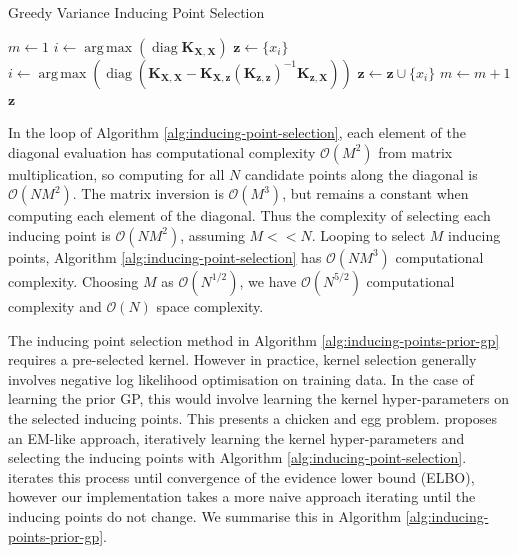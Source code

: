 \documentclass{article}
\newcommand{\diag}{\operatorname{diag}}
\DeclareMathOperator*{\argmax}{arg\,max}
\numberwithin{equation}{section}
\begin{document}
\begin{algorithm}
\caption{Greedy Variance Inducing Point Selection}\label{alg:inducing-point-selection}
\begin{algorithmic}
\State $m \leftarrow 1$
 \State $i \leftarrow \argmax \left(\diag\mathbf{K}_{\mathbf{X}, \mathbf{X}}\right) $
 \State $\mathbf{z} \leftarrow \{x_i\}$
\State$i \leftarrow \argmax \left(\diag \left(\mathbf{K}_{\mathbf{X}, \mathbf{X}} - \mathbf{K}_{\mathbf{X}, \mathbf{z}} \left(\mathbf{K}_{\mathbf{z}, \mathbf{z}}\right)^{-1}\mathbf{K}_{\mathbf{z}, \mathbf{X}}\right)\right)$
 \State  $\mathbf{z} \leftarrow \mathbf{z} \cup \{x_i\}$
 \State  $m \leftarrow m+1$
\EndWhile
\State \Return $\mathbf{z}$
\end{algorithmic}
\end{algorithm}

In the loop of Algorithm \ref{alg:inducing-point-selection}, each element of the diagonal evaluation has computational complexity $\mathcal{O}(M^2)$ from matrix multiplication, so computing for all $N$ candidate points along the diagonal is $\mathcal{O}(NM^2)$.
The matrix inversion is $\mathcal{O}(M^3)$, but remains a constant when computing each element of the diagonal.
Thus the complexity of selecting each inducing point is $\mathcal{O}(NM^2)$, assuming $M << N$.
Looping to select $M$ inducing points, Algorithm \ref{alg:inducing-point-selection} has $\mathcal{O}(NM^3)$ computational complexity.
Choosing $M$ as $\mathcal{O}(N^{1/2})$, we have $\mathcal{O}(N^{5/2})$ computational complexity and $\mathcal{O}(N)$ space complexity.

The inducing point selection method in Algorithm \ref{alg:inducing-points-prior-gp} requires a pre-selected kernel.
However in practice, kernel selection generally involves negative log likelihood optimisation on training data.
In the case of learning the prior GP, this would involve learning the kernel hyper-parameters on the selected inducing points.
This presents a chicken and egg problem.
\cite{burt2020convergence} proposes an EM-like approach, iteratively learning the kernel hyper-parameters and selecting the inducing points with Algorithm \ref{alg:inducing-point-selection}. \cite{burt2020convergence} iterates this process until convergence of the evidence lower bound (ELBO), however our implementation takes a more naive approach iterating until the inducing points do not change. We summarise this in Algorithm \ref{alg:inducing-points-prior-gp}.
\end{document}
